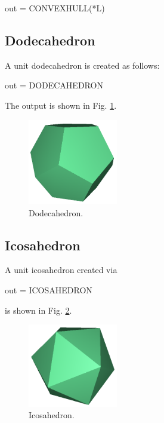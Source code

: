 \begin{bluecode}
out = CONVEXHULL(*L)
\end{bluecode}


\subsection{Dodecahedron}

A unit dodecahedron is created as follows:

\begin{bluecode}
out = DODECAHEDRON
\end{bluecode}
The output is shown in Fig. \ref{fig:dodeca}.
\newpage

\begin{figure}[!ht]
\begin{center}
\includegraphics[width=0.35\textwidth]{img/dodeca-2.png}
\end{center}
\vspace{-4mm}
\caption{Dodecahedron.}
\label{fig:dodeca}
\end{figure}

\subsection{Icosahedron}

A unit icosahedron created via

\begin{bluecode}
out = ICOSAHEDRON
\end{bluecode}
is shown in Fig. \ref{fig:icosa}.

\begin{figure}[!ht]
\begin{center}
\includegraphics[width=0.35\textwidth]{img/icosa-2.png}
\end{center}
\vspace{-4mm}
\caption{Icosahedron.}
\label{fig:icosa}
\end{figure}

